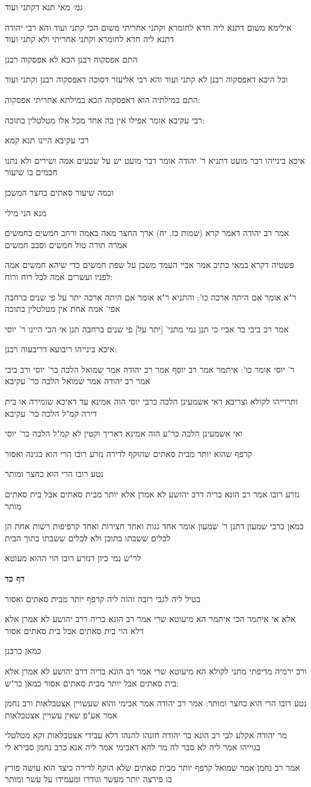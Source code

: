 \documentclass[12pt, openany]{book}
\newcommand{\sethebfont}{
\fontsize{10.5pt}{21.0pt} \selectfont
}
\newcommand{\textblock}[1]{
{\sethebfont #1\\}	
}
\newcommand{\sectname}{}
\newcommand{\newsection}[1]{
	\addcontentsline{toc}{section}{#1}
	\renewcommand{\sectname}{#1}	
	\vspace{-\baselineskip}
	\begin{center}
		\textbf{%
\fontsize{16pt}{16pt}\selectfont
			#1}
	\end{center}
	\vspace{-\baselineskip}
	\nopagebreak
}
\begin{document}
\textblock{{\large\emph{גמ׳}} מאי תנא דקתני ועוד}
\textblock{אילימא משום דתנא ליה חדא לחומרא וקתני אחריתי משום הכי קתני ועוד והא רבי יהודה דתנא ליה חדא לחומרא וקתני אחריתי ולא קתני ועוד}
\textblock{התם אפסקוה רבנן הכא לא אפסקוה רבנן}
\textblock{וכל היכא דאפסקוה רבנן לא קתני ועוד והא רבי אליעזר דסוכה דאפסקוה רבנן וקתני ועוד}
\textblock{התם במילתיה הוא דאפסקוה הכא במילתא אחריתי אפסקוה:}
\textblock{רבי עקיבא אומר אפילו אין בה אחד מכל אלו מטלטלין בתוכה:}
\textblock{רבי עקיבא היינו תנא קמא}
\textblock{איכא בינייהו דבר מועט דתניא ר' יהודה אומר דבר מועט יש על שבעים אמה ושירים ולא נתנו חכמים בו שיעור}
\textblock{וכמה שיעור סאתים כחצר המשכן}
\textblock{מנא הני מילי}
\textblock{אמר רב יהודה דאמר קרא (שמות כז, יח) ארך החצר מאה באמה ורחב חמשים בחמשים אמרה תורה טול חמשים וסבב חמשים}
\textblock{פשטיה דקרא במאי כתיב אמר אביי העמד משכן על שפת חמשים כדי שיהא חמשים אמה לפניו ועשרים אמה לכל רוח ורוח:}
\textblock{ר"א אומר אם היתה ארכה כו': והתניא ר"א אומר אם היתה ארכה יתר על פי שנים ברחבה אפי' אמה אחת אין מטלטלין בתוכה}
\textblock{אמר רב ביבי בר אביי כי תנן נמי מתני' [יתר על] פי שנים ברחבה תנן אי הכי היינו ר' יוסי}
\textblock{איכא בינייהו ריבועא דריבעוה רבנן:}
\textblock{ר' יוסי אומר כו': איתמר אמר רב יוסף אמר רב יהודה אמר שמואל הלכה כר' יוסי ורב ביבי אמר רב יהודה אמר שמואל הלכה כר' עקיבא}
\textblock{ותרוייהו לקולא וצריכא דאי אשמעינן הלכה כרבי יוסי הוה אמינא עד דאיכא שומירה או בית דירה קמ"ל הלכה כר' עקיבא}
\textblock{ואי אשמעינן הלכה כר"ע הוה אמינא דאריך וקטין לא קמ"ל הלכה כר' יוסי}
\textblock{קרפף שהוא יותר מבית סאתים שהוקף לדירה נזרע רובו הרי הוא כגינה ואסור}
\textblock{נטע רובו הרי הוא כחצר ומותר}
\textblock{נזרע רובו אמר רב הונא בריה דרב יהושע לא אמרן אלא יותר מבית סאתים אבל בית סאתים מותר}
\textblock{כמאן כרבי שמעון דתנן ר' שמעון אומר אחד גגות ואחד חצירות ואחד קרפיפות רשות אחת הן לכלים ששבתו בתוכן ולא לכלים ששבתו בתוך הבית}
\textblock{לר"ש נמי כיון דנזרע רובו הוי ההוא מעוטא}
\newsection{דף כד}
\textblock{בטיל ליה לגבי רובה והוה ליה קרפף יותר מבית סאתים ואסור}
\textblock{אלא אי איתמר הכי איתמר הא מיעוטא שרי אמר רב הונא בריה דרב יהושע לא אמרן אלא דלא הוי בית סאתים אבל בית סאתים אסור}
\textblock{כמאן כרבנן}
\textblock{ורב ירמיה מדיפתי מתני לקולא הא מיעוטא שרי אמר רב הונא בריה דרב יהושע לא אמרן אלא בית סאתים אבל יותר מבית סאתים אסור כמאן כר"ש:}
\textblock{נטע רובו הרי הוא כחצר ומותר: אמר רב יהודה אמר אבימי והוא שעשויין אצטבלאות ורב נחמן אמר אע"פ שאין עשויין אצטבלאות}
\textblock{מר יהודה אקלע לבי רב הונא בר יהודה חזנהו להנהו דלא עבידי אצטבלאות וקא מטלטלי בגוייהו אמר ליה לא סבר לה מר להא דאבימי אמר ליה אנא כרב נחמן סבירא לי}
\textblock{אמר רב נחמן אמר שמואל קרפף יותר מבית סאתים שלא הוקף לדירה כיצד הוא עושה פורץ בו פירצה יותר מעשר וגודרו ומעמידו על עשר ומותר}
\end{document}
